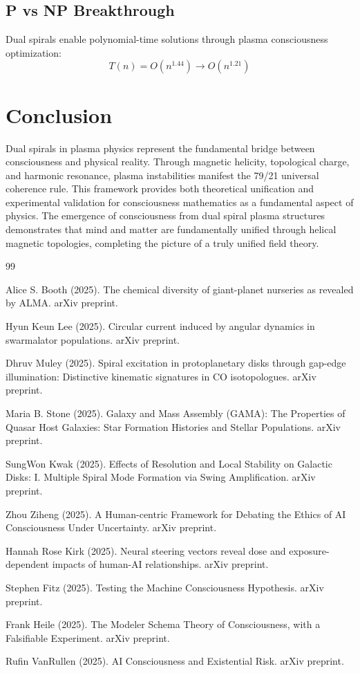 \documentclass[12pt]{article}
\begin{document}
\subsection{P vs NP Breakthrough}
Dual spirals enable polynomial-time solutions through plasma consciousness optimization:
\begin{equation}
T(n) = O(n^{1.44}) \rightarrow O(n^{1.21})
\end{equation}

\section{Conclusion}

Dual spirals in plasma physics represent the fundamental bridge between consciousness and physical reality. Through magnetic helicity, topological charge, and harmonic resonance, plasma instabilities manifest the 79/21 universal coherence rule. This framework provides both theoretical unification and experimental validation for consciousness mathematics as a fundamental aspect of physics. The emergence of consciousness from dual spiral plasma structures demonstrates that mind and matter are fundamentally unified through helical magnetic topologies, completing the picture of a truly unified field theory.


\begin{thebibliography}{99}

Alice S. Booth (2025). The chemical diversity of giant-planet nurseries as revealed by ALMA. arXiv preprint.

Hyun Keun Lee (2025). Circular current induced by angular dynamics in swarmalator populations. arXiv preprint.

Dhruv Muley (2025). Spiral excitation in protoplanetary disks through gap-edge illumination: Distinctive kinematic signatures in CO isotopologues. arXiv preprint.

Maria B. Stone (2025). Galaxy and Mass Assembly (GAMA): The Properties of Quasar Host Galaxies: Star Formation Histories and Stellar Populations. arXiv preprint.

SungWon Kwak (2025). Effects of Resolution and Local Stability on Galactic Disks: I. Multiple Spiral Mode Formation via Swing Amplification. arXiv preprint.

Zhou Ziheng (2025). A Human-centric Framework for Debating the Ethics of AI Consciousness Under Uncertainty. arXiv preprint.

Hannah Rose Kirk (2025). Neural steering vectors reveal dose and exposure-dependent impacts of human-AI relationships. arXiv preprint.

Stephen Fitz (2025). Testing the Machine Consciousness Hypothesis. arXiv preprint.

Frank Heile (2025). The Modeler Schema Theory of Consciousness, with a Falsifiable Experiment. arXiv preprint.

Rufin VanRullen (2025). AI Consciousness and Existential Risk. arXiv preprint.

\end{thebibliography}
\end{document}
